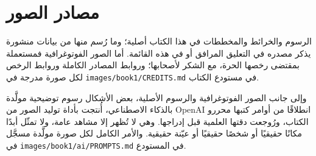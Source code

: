 \chapter*{مصادر الصور}

الرسوم والخرائط والمخططات في هذا الكتاب أصلية؛ وما رُسم منها من بيانات
منشورة يذكر مصدره في التعليق المرافق أو في هذه القائمة. أما الصور
الفوتوغرافية فمستعملة بمقتضى رخصها الحرة، مع الشكر لأصحابها؛ وروابط المصادر
الكاملة وروابط الرخص لكل صورة مدرجة في \texttt{images/book1/CREDITS.md} في
مستودع الكتاب.

\bigskip
وإلى جانب الصور الفوتوغرافية والرسوم الأصلية، بعض الأشكال رسوم توضيحية
مولَّدة بالذكاء الاصطناعي، أُنتجت بأداة توليد الصور من OpenAI انطلاقًا من
أوامر كتبها محررو الكتاب، ورُوجعت دقتها العلمية قبل إدراجها. وهي لا تُظهر
إلا مشاهد عامة، ولا تمثّل أبدًا مكانًا حقيقيًا أو شخصًا حقيقيًا أو عيّنة
حقيقية. والأمر الكامل لكل صورة مولَّدة مسجَّل في
\texttt{images/book1/ai/PROMPTS.md} في المستودع.

